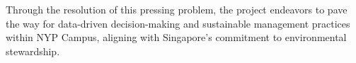 Through the resolution of this pressing problem, the project endeavors to pave the way for data-driven decision-making and sustainable management practices within NYP Campus, aligning with Singapore's commitment to environmental stewardship.

% 
% 
% 
